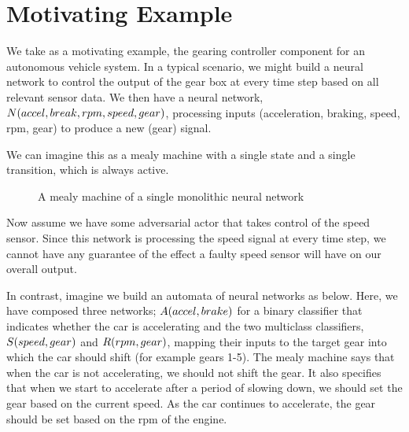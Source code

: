 \section{Motivating Example}

We take as a motivating example, the gearing controller component for an autonomous vehicle system.
In a typical scenario, we might build a neural network to control the output of the gear box at every time step based on all relevant sensor data.
We then have a neural network, $N(accel,break,rpm,speed,gear)$, processing inputs (acceleration, braking, speed, rpm, gear) to produce a new (gear) signal.

We can imagine this as a mealy machine with a single state and a single transition, which is always active.

\begin{figure}[h!]
\centering
{}
\caption{A mealy machine of a single monolithic neural network}
\label{fig:full}
\end{figure}

Now assume we have some adversarial actor that takes control of the speed sensor.
Since this network is processing the speed signal at every time step, we cannot have any guarantee of the effect a faulty speed sensor will have on our overall output.

In contrast, imagine we build an automata of neural networks as below.
Here, we have composed three networks; $A(accel,brake)$ for a binary classifier that indicates whether the car is accelerating and the two multiclass classifiers, $S(speed,gear)$ and $R(rpm,gear)$, mapping their inputs to the target gear into which the car should shift (for example gears 1-5).
The mealy machine says that when the car is not accelerating, we should not shift the gear.
It also specifies that when we start to accelerate after a period of slowing down, we should set the gear based on the current speed.
As the car continues to accelerate, the gear should be set based on the rpm of the engine.

